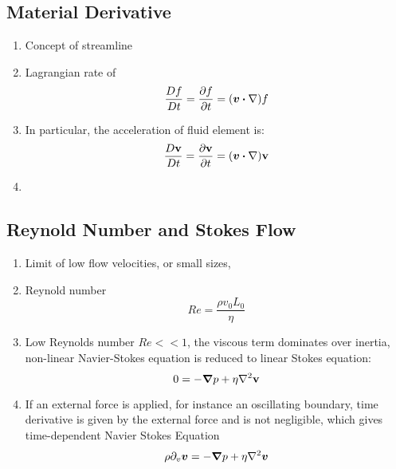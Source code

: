 \documentclass[12pt,a4paper]{article}
\begin{document}
        \subsection{Material Derivative}
            \begin{enumerate}
                \item Concept of streamline
                \item Lagrangian rate of 
                \begin{equation}
                    \frac{Df}{Dt} = \pdv{f}{t} = (\vb*{v} \dotproduct \vb{\nabla})f
                \end{equation}
                \item In particular, the acceleration of fluid element is:
                \begin{equation}
                    \frac{D\vb{v}}{Dt} = \pdv{\vb{v}}{t} = (\vb*{v} \dotproduct \vb{\nabla})\vb{v}
                \end{equation}
                \item 
            \end{enumerate}
        \subsection{Reynold Number and Stokes Flow}
            \begin{enumerate}
                \item Limit of low flow velocities, or small sizes, 
                \item Reynold number 
                \begin{equation}
                    Re =\frac{\rho v_0 L_0}{\eta}
                \end{equation}
                \item Low Reynolds number $Re << 1$, the viscous term dominates over inertia, non-linear Navier-Stokes equation is reduced to linear Stokes equation:
                \begin{equation}
                    0 = -\grad p +\eta\laplacian \vb{v}
                \end{equation}
                \item If an external force is applied, for instance an oscillating boundary, time derivative is given by the external force and is not negligible, which gives time-dependent Navier Stokes Equation
                \begin{equation}
                    \rho \partial_{v}\vb*{v} = -\grad p +\eta\laplacian \vb*{v}
                \end{equation}
            \end{enumerate}
\end{document}
